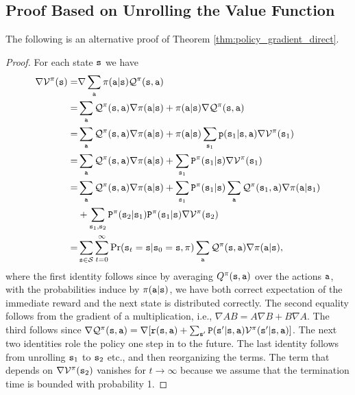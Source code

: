 \subsection{Proof Based on Unrolling the Value Function}
The following is an alternative proof of Theorem \ref{thm:policy_gradient_direct}.
\begin{proof}
For each state ${\tt s}$ we have
\begin{align*}
\nabla \mathcal{V}^\pi({\tt s}) =& \nabla \sum_{\tt a} \pi({\tt a}|{\tt s}) \mathcal{Q}^\pi({\tt s},{\tt a})\\
=&\sum_{\tt a}  \mathcal{Q}^\pi({\tt s},{\tt a}) \nabla \pi({\tt a}|{\tt s}) + \pi({\tt a}|{\tt s}) \nabla \mathcal{Q}^\pi({\tt s},{\tt a})\\
=&\sum_{\tt a}  \mathcal{Q}^\pi({\tt s},{\tt a}) \nabla \pi({\tt a}|{\tt s}) + \pi({\tt a}|{\tt s}) \sum_{{\tt s}_1} {\tt p}({\tt s}_1|{\tt s},{\tt a}) \nabla \mathcal{V}^\pi({\tt s}_1)\\
=& \sum_{\tt a}  \mathcal{Q}^\pi({\tt s},{\tt a}) \nabla
\pi({\tt a}|{\tt s}) + \sum_{{\tt s}_1} {\tt P}^{\pi}({\tt s}_1|{\tt s})
\nabla \mathcal{V}^\pi({\tt s}_1)\\
=& \sum_{\tt a}  \mathcal{Q}^\pi({\tt s},{\tt a}) \nabla
\pi({\tt a}|{\tt s}) + \sum_{{\tt s}_1} {\tt P}^{\pi}({\tt s}_1|{\tt s})
\sum_{\tt a} \mathcal{Q}^\pi({\tt s}_1,{\tt a}) \nabla
\pi({\tt a}|{\tt s}_1) \\
& + \sum_{{\tt s}_1, {\tt s}_2}
{\tt P}^{\pi}({\tt s}_2|{\tt s}_1){\tt P}^{\pi}({\tt s}_1|{\tt s})
\nabla \mathcal{V}^\pi({\tt s}_2)\\
=& \sum_{{\tt s}\in
\mathcal{S}}\sum_{t=0}^\infty \Pr({\tt s}_t = {\tt s} | {\tt s}_0 = {\tt s}, \pi) \sum_{\tt a}
\mathcal{Q}^\pi({\tt s},{\tt a})\nabla\pi({\tt a}|{\tt s}),
\end{align*}
where the first identity follows since by averaging $Q^\pi({\tt s},{\tt a})$ over the actions ${\tt a}$, with the
probabilities induce by $\pi({\tt a}|{\tt s})$, we have both correct expectation of the immediate reward and the next state is distributed correctly. The second equality follows from the gradient of a multiplication, i.e., $\nabla AB=A\nabla B+B\nabla A$. The third follows since 
$\nabla \mathcal{Q}^\pi({\tt s},{\tt a})= \nabla
[{\tt r}({\tt s},{\tt a})+
\sum_{{\tt s}'}{\tt P}({\tt s}'|{\tt s},{\tt a})\mathcal{V}^\pi({\tt s}'|{\tt s},{\tt a})]$.
%
The next two identities role the policy one step in to the future.
%
The last identity follows from unrolling ${\tt s}_1$ to ${\tt s}_2$ etc., and then reorganizing the terms. The term that depends on $\nabla \mathcal{V}^\pi({\tt s}_2)$ vanishes for $t\to\infty$ because we assume that the termination time is bounded with probability 1.


\end{proof}
